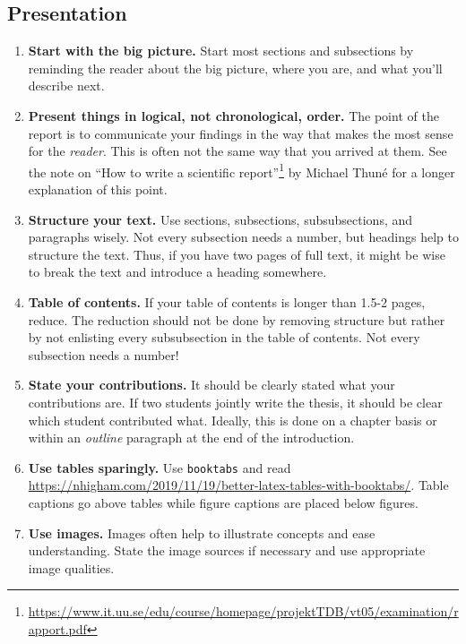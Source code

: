 \documentclass[twoside,11pt]{article}
\begin{document}
\subsection*{Presentation}
\begin{enumerate}
     \item \textbf{Start with the big picture.} Start most sections and subsections by reminding the reader about the big picture, where you are, and what you'll describe next.
    
    \item \textbf{Present things in logical, not chronological, order.} The point of the report is to communicate your findings in the way that makes the most sense for the \emph{reader}. This is often not the same way that you arrived at them. See the note on ``How to write a scientific report''\footnote{\url{https://www.it.uu.se/edu/course/homepage/projektTDB/vt05/examination/rapport.pdf}} by Michael Thuné for a longer explanation of this point.
    
     \item \textbf{Structure your text.} Use sections, subsections, subsubsections, and paragraphs wisely. Not every subsection needs a number, but headings help to structure the text. Thus, if you have two pages of full text, it might be wise to break the text and introduce a heading somewhere.
     
    \item \textbf{Table of contents.} If your table of contents is longer than 1.5-2 pages, reduce. The reduction should not be done by removing structure but rather by not enlisting every subsubsection in the table of contents. Not every subsection needs a number!

    \item \textbf{State your contributions.} It should be clearly stated what your contributions are. If two students jointly write the thesis, it should be clear which student contributed what. Ideally, this is done on a chapter basis or within an \textit{outline} paragraph at the end of the introduction. 

    \item \textbf{Use tables sparingly.} Use \texttt{booktabs} and read \url{https://nhigham.com/2019/11/19/better-latex-tables-with-booktabs/}. Table captions go above tables while figure captions are placed below figures.
    
    \item \textbf{Use images.} Images often help to illustrate concepts and ease understanding. State the image sources if necessary and use appropriate image qualities. 
    

\end{enumerate}
\end{document}
